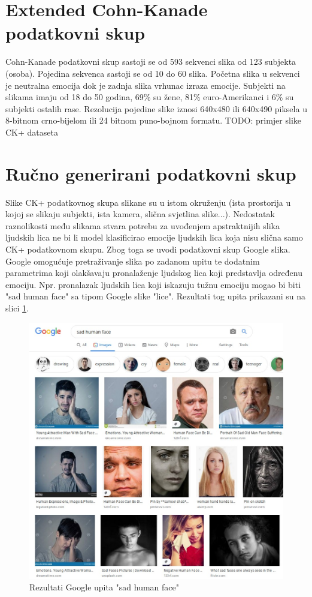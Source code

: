 \documentclass[times, utf8, zavrsni,numeric]{fer}
\begin{document}
\section{Extended Cohn-Kanade podatkovni skup}

Cohn-Kanade podatkovni skup sastoji se od 593 sekvenci slika od 123 subjekta (osoba). Pojedina sekvenca sastoji se od 10 do 60 slika. Početna slika u sekvenci je neutralna emocija dok je zadnja slika vrhunac izraza emocije. Subjekti na slikama imaju od 18 do 50 godina, 69\% su žene, 81\% euro-Amerikanci i 6\% su subjekti ostalih rase. Rezolucija pojedine slike iznosi 640x480 ili 640x490 piksela u 8-bitnom crno-bijelom ili 24 bitnom puno-bojnom formatu\cite{ck}. TODO: primjer slike CK+ dataseta

\section{Ručno generirani podatkovni skup}
Slike CK+ podatkovnog skupa slikane su u istom okruženju (ista prostorija u kojoj se slikaju subjekti, ista kamera, slična svjetlina slike...). Nedostatak raznolikosti među slikama stvara potrebu za uvođenjem apstraktnijih slika ljudskih lica ne bi li model klasificirao emocije ljudskih lica koja nisu slična samo CK+ podatkovnom skupu. Zbog toga se uvodi podatkovni skup Google slika. Google omogućuje pretraživanje slika po zadanom upitu te dodatnim parametrima koji olakšavaju pronalaženje ljudskog lica koji predstavlja određenu emociju. Npr. pronalazak ljudskih lica koji iskazuju tužnu emociju mogao bi biti "sad human face" sa tipom Google slike "lice". Rezultati tog upita prikazani su na slici \ref{pic:google_search_sad}.

\begin{figure}[H]
	\includegraphics[width=\linewidth]{2020-06-08-22-16-22.jpeg}
	\caption{Rezultati Google upita "sad human face"}
	\label{pic:google_search_sad}
\end{figure}
\end{document}

